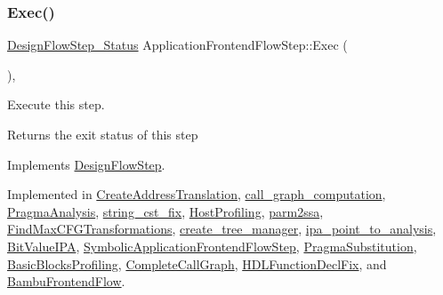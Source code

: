 \subsubsection{\texorpdfstring{Exec()}{Exec()}}
{\footnotesize\ttfamily \hyperlink{design__flow__step_8hpp_afb1f0d73069c26076b8d31dbc8ebecdf}{Design\+Flow\+Step\+\_\+\+Status} Application\+Frontend\+Flow\+Step\+::\+Exec (\begin{DoxyParamCaption}{ }\end{DoxyParamCaption})\hspace{0.3cm}{\ttfamily [override]}, {}}



Execute this step. 

\begin{DoxyReturn}{Returns}
the exit status of this step 
\end{DoxyReturn}


Implements \hyperlink{classDesignFlowStep_a77d7e38493016766098711ea24f60b89}{Design\+Flow\+Step}.



Implemented in \hyperlink{classCreateAddressTranslation_a1213d1228ac3e336e8425ebacdf1ab60}{Create\+Address\+Translation}, \hyperlink{classcall__graph__computation_a59dbe3059afb5101f03f746b52e49d0e}{call\+\_\+graph\+\_\+computation}, \hyperlink{classPragmaAnalysis_a972bd7b68f27335d6fbf6e1d327c2663}{Pragma\+Analysis}, \hyperlink{classstring__cst__fix_a366deb5000664520f5b7979a5ecb48bc}{string\+\_\+cst\+\_\+fix}, \hyperlink{classHostProfiling_a9cf2a3820514e3a207c5e975a25f7d04}{Host\+Profiling}, \hyperlink{classparm2ssa_ae308e612abcdd8e6cb9dcf490e774065}{parm2ssa}, \hyperlink{classFindMaxCFGTransformations_a6ac50147095421ddfda88a6fbb33e969}{Find\+Max\+C\+F\+G\+Transformations}, \hyperlink{classcreate__tree__manager_a1703cbe6a6f2df1ca3ef7809e8682fac}{create\+\_\+tree\+\_\+manager}, \hyperlink{classipa__point__to__analysis_a9ef230477061e15dd1550e1ca226aa79}{ipa\+\_\+point\+\_\+to\+\_\+analysis}, \hyperlink{classBitValueIPA_a83d4228b39c126b0007701f32409a71c}{Bit\+Value\+I\+PA}, \hyperlink{classSymbolicApplicationFrontendFlowStep_ad75eb18151a95dc374523c24ec78a1b5}{Symbolic\+Application\+Frontend\+Flow\+Step}, \hyperlink{classPragmaSubstitution_a77d4052228752a2ea2a3541f9340bce2}{Pragma\+Substitution}, \hyperlink{classBasicBlocksProfiling_a3a818424991cbd10f25d89e2f2d0417d}{Basic\+Blocks\+Profiling}, \hyperlink{classCompleteCallGraph_adfe7bbc7b2950105a2fd26b29436964e}{Complete\+Call\+Graph}, \hyperlink{classHDLFunctionDeclFix_aea64c6af343b3a2cebbfd0dda66cb1e1}{H\+D\+L\+Function\+Decl\+Fix}, and \hyperlink{classBambuFrontendFlow_a12e11602383ea4902d93e20f2400eed3}{Bambu\+Frontend\+Flow}.


